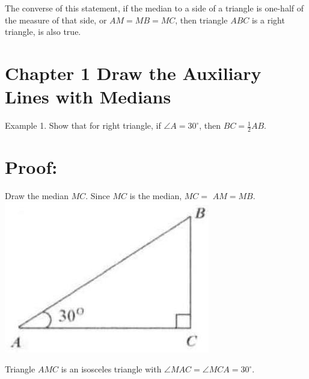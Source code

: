 \documentclass[10pt]{article}
\begin{document}
The converse of this statement, if the median to a side of a triangle is one-half of the measure of that side, or \(A M=M B=M C\), then triangle \(A B C\) is a right triangle, is also true.

\section*{Chapter 1 Draw the Auxiliary Lines with Medians}
Example 1. Show that for right triangle, if \(\angle A=30^{\circ}\), then \(B C=\frac{1}{2} A B\).

\section*{Proof:}
Draw the median \(M C\). Since \(M C\) is the median, \(M C=\) \(A M=M B\).\\
\includegraphics[max width=\textwidth, center]{2025_04_17_97bc1f7e44d93c271a88g-009(4)}

Triangle \(A M C\) is an isosceles triangle with \(\angle M A C=\angle M C A=30^{\circ}\).
\end{document}
